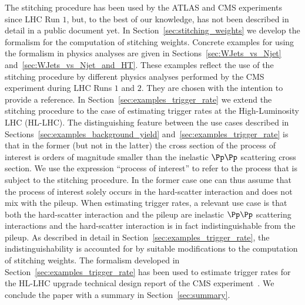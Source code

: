 The stitching procedure has been used by the ATLAS and CMS experiments since LHC Run $1$,
but, to the best of our knowledge, has not been described in detail in a public document yet.
In Section~\ref{sec:stitching_weights} we develop the formalism for the computation of stitching weights.
Concrete examples for using the formalism in physics analyses are given in Sections~\ref{sec:WJets_vs_Njet} and~\ref{sec:WJets_vs_Njet_and_HT}.
These examples reflect the use of the stitching procedure by different physics analyses performed by the CMS experiment during LHC Runs $1$ and $2$.
They are chosen with the intention to provide a reference.
In Section~\ref{sec:examples_trigger_rate} we extend the stitching procedure to the case of estimating trigger rates at the High-Luminosity LHC (HL-LHC).
The distinguishing feature between the use cases described in Sections~\ref{sec:examples_background_yield} and~\ref{sec:examples_trigger_rate}
is that in the former (but not in the latter) the cross section of the process of interest
is orders of magnitude smaller than the inelastic $\Pp\Pp$ scattering cross section.
We use the expression ``process of interest'' to refer to the process that is subject to the stitching procedure.
In the former case one can thus assume that the process of interest solely occurs in the hard-scatter interaction
and does not mix with the pileup.
When estimating trigger rates, a relevant use case is that both the hard-scatter interaction and the pileup are inelastic $\Pp\Pp$ scattering interactions
and the hard-scatter interaction is in fact indistinguishable from the pileup.
As described in detail in Section~\ref{sec:examples_trigger_rate},
the indistinguishability is accounted for by suitable modifications to the computation of stitching weights.
The formalism developed in Section~\ref{sec:examples_trigger_rate} has been used to estimate trigger rates 
for the HL-LHC upgrade technical design report of the CMS experiment~\cite{TDR-21-001}.
We conclude the paper with a summary in Section~\ref{sec:summary}.
